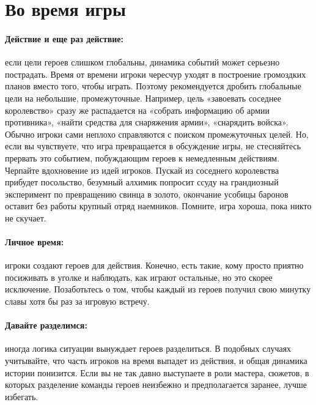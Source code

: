 \section{Во время игры}
\paragraph{Действие и еще раз действие:} если цели героев слишком глобальны, динамика событий может серьезно пострадать. Время от времени игроки чересчур уходят в построение громоздких планов вместо того, чтобы играть. Поэтому рекомендуется дробить глобальные цели на небольшие, промежуточные. Например, цель «завоевать соседнее королевство» сразу же распадается на «собрать информацию об армии противника», «найти средства для снаряжения армии», «снарядить войска». Обычно игроки сами неплохо справляются с поиском промежуточных целей. Но, если вы чувствуете, что игра превращается в обсуждение игры, не стесняйтесь прервать это событием, побуждающим героев к немедленным действиям. Черпайте вдохновение из идей игроков. Пускай из соседнего королевства прибудет посольство, безумный алхимик попросит ссуду на грандиозный эксперимент по превращению свинца в золото, окончание усобицы баронов оставит без работы крупный отряд наемников. Помните, игра хороша, пока никто не скучает.
\paragraph{Личное время:} игроки создают героев для действия. Конечно, есть такие, кому просто приятно посиживать в уголке и наблюдать, как играют остальные, но это скорее исключение. Позаботьтесь о том, чтобы каждый из героев получил свою минутку славы хотя бы раз за игровую встречу.
\paragraph{Давайте разделимся:} иногда логика ситуации вынуждает героев разделиться. В подобных случаях учитывайте, что часть игроков на время выпадет из действия, и общая динамика истории понизится. Если вы не так давно выступаете в роли мастера, сюжетов, в которых разделение команды героев неизбежно и предполагается заранее, лучше избегать.

